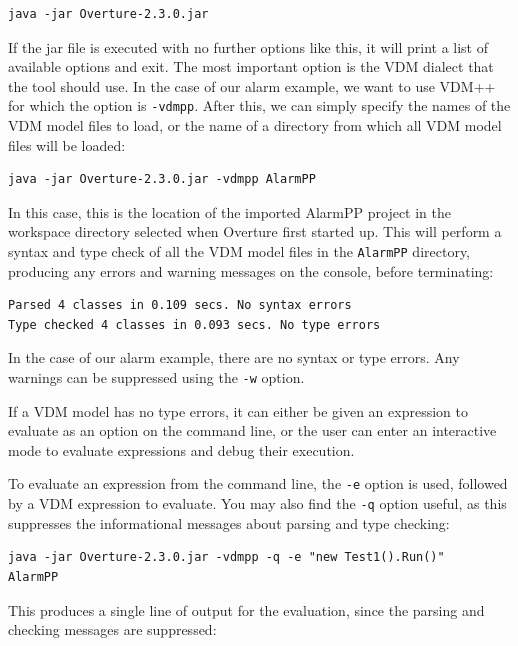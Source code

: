 \lstset{style=tool,language=}
\begin{lstlisting}
java -jar Overture-2.3.0.jar
\end{lstlisting}

\noindent If the jar file is executed with no further options like this, it will print a list of available options and exit. The most important option is the VDM dialect that the tool should use. In the case of our alarm example, we want to use VDM++ for which the option is \verb|-vdmpp|. After this, we can simply specify the names of the VDM model files to load, or the name of a directory from which all VDM model files will be loaded:

\begin{lstlisting}
java -jar Overture-2.3.0.jar -vdmpp AlarmPP
\end{lstlisting}

\noindent In this case, this is the location of the imported AlarmPP project in the workspace directory selected when Overture first started up.  This will perform a syntax and type check of all the VDM model files in the \verb|AlarmPP| directory, producing any errors and warning messages on the console, before terminating:

\begin{lstlisting}
Parsed 4 classes in 0.109 secs. No syntax errors
Type checked 4 classes in 0.093 secs. No type errors
\end{lstlisting}

\noindent In the case of our alarm example, there are no syntax or type errors. Any warnings can be suppressed using the \verb|-w| option.

If a VDM model has no type errors, it can either be given an expression to evaluate as an option on the command line, or the user can enter an interactive mode to evaluate expressions and debug their execution.

To evaluate an expression from the command line, the \verb|-e| option is used, followed by a VDM expression to evaluate. You may also find the \verb|-q| option useful, as this suppresses the informational messages about parsing and type checking:

\begin{lstlisting}
java -jar Overture-2.3.0.jar -vdmpp -q -e "new Test1().Run()"
AlarmPP
\end{lstlisting}

\noindent This produces a single line of output for the evaluation, since the parsing and checking messages are suppressed:

